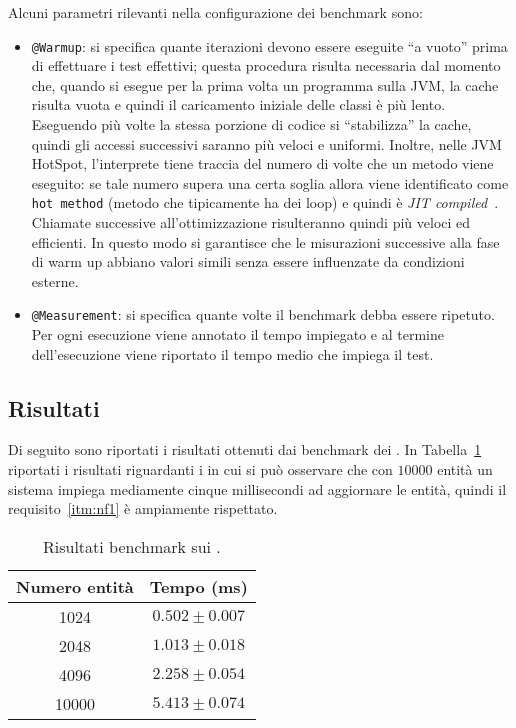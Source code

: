 Alcuni parametri rilevanti nella configurazione dei benchmark sono:
\begin{itemize}
    \item \texttt{@Warmup}: si specifica quante iterazioni devono essere eseguite ``a vuoto'' prima di effettuare i
    test effettivi;
    questa procedura risulta necessaria dal momento che, quando si esegue per la prima volta un programma sulla JVM, la
    cache risulta vuota e quindi il caricamento iniziale delle classi è più lento.
    Eseguendo più volte la stessa porzione di codice si ``stabilizza'' la cache, quindi gli accessi successivi saranno
    più veloci e uniformi.
    Inoltre, nelle JVM HotSpot, l'interprete tiene traccia del numero di volte che un metodo viene eseguito: se tale
    numero supera una certa soglia allora viene identificato come \texttt{hot method} (metodo che tipicamente ha dei
    loop) e quindi è \textit{JIT compiled}~\cite{jmh:details}.
    Chiamate successive all'ottimizzazione risulteranno quindi più veloci ed efficienti.
    In questo modo si garantisce che le misurazioni successive alla fase di warm up abbiano valori simili senza essere
    influenzate da condizioni esterne.
    \item \texttt{@Measurement}: si specifica quante volte il benchmark debba essere ripetuto.
    Per ogni esecuzione viene annotato il tempo impiegato e al termine dell'esecuzione viene riportato il tempo medio
    che impiega il test.
\end{itemize}

\subsection{Risultati}\label{subsec:risultati}
Di seguito sono riportati i risultati ottenuti dai benchmark dei \System.
In Tabella~\ref{tab:benchmark} riportati i risultati riguardanti i \System in cui si può osservare che con $10000$
entità un sistema impiega mediamente cinque millisecondi ad aggiornare le entità, quindi il requisito~\ref{itm:nf1} è
ampiamente rispettato.

\begin{table}[H]
    \centering
    \begin{tabular}{c c}
        \toprule
        Numero entità & Tempo (ms) \\ \midrule
        1024 & $0.502 \pm 0.007$ \\
        2048 & $1.013 \pm 0.018$ \\
        4096 & $2.258 \pm 0.054$ \\
        10000 & $5.413 \pm 0.074$ \\
        \bottomrule
    \end{tabular}
    \caption{\label{tab:benchmark}Risultati benchmark sui \System.}
\end{table}

